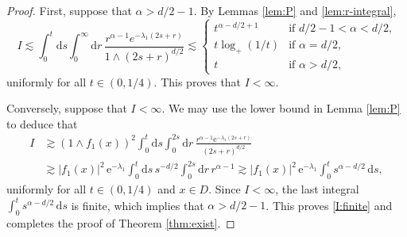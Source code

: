 \documentclass[reqno]{amsart}
\DeclareMathOperator{\Var}{Var}
\renewcommand{\d}{\mathrm d}
\newcommand{\e}{\mathrm e}
\newcommand{\1}{\mathbf 1}
\numberwithin{equation}{section}
\theoremstyle{definition}
\begin{document}
\begin{proof}
First, suppose that $\alpha>d/2-1$.
By Lemmas \ref{lem:P} and \ref{lem:r-integral}, 
\[
	I \lesssim \int_0^t \d s \int_0^\infty \d r \, \frac{r^{\alpha-1} e^{-\lambda_1(2s+r)}}{1 \wedge (2s+r)^{d/2}} \lesssim \begin{cases}
	t^{\alpha-d/2 + 1} & \text{if $d/2-1<\alpha<d/2$,}\\
	t \log_+(1/t) & \text{if $\alpha=d/2$,}\\
	t & \text{if $\alpha>d/2$,}
	\end{cases}
\]
uniformly for all $t \in (0,1/4)$. 
This proves that $I<\infty$.

Conversely, suppose that $I<\infty$. We may use the lower bound in Lemma \ref{lem:P} to deduce that
\begin{align*}
	I &\gtrsim (1\wedge f_1(x))^2 \int_0^t \d s \int_0^{2s} \d r \, \frac{r^{\alpha-1}\e^{-\lambda_1(2s+r)}}{(2s+r)^{d/2}}\\
        &\gtrsim |f_1(x)|^2\, \e^{-\lambda_1} \int_0^t \d s\, s^{-d/2} \int_0^{2s} \d r \, r^{\alpha-1}
        \gtrsim |f_1(x)|^2\, \e^{-\lambda_1}\int_0^t s^{\alpha-d/2} \, \d s,
\end{align*}
uniformly for all $t \in (0,1/4)$ and $x \in D$.
Since $I<\infty$, the last integral $\int_0^t s^{\alpha-d/2} \, \d s$ is finite, which implies that $\alpha>d/2-1$.
This proves \eqref{I:finite} and completes the proof of Theorem \ref{thm:exist}.
\end{proof}
\end{document}
